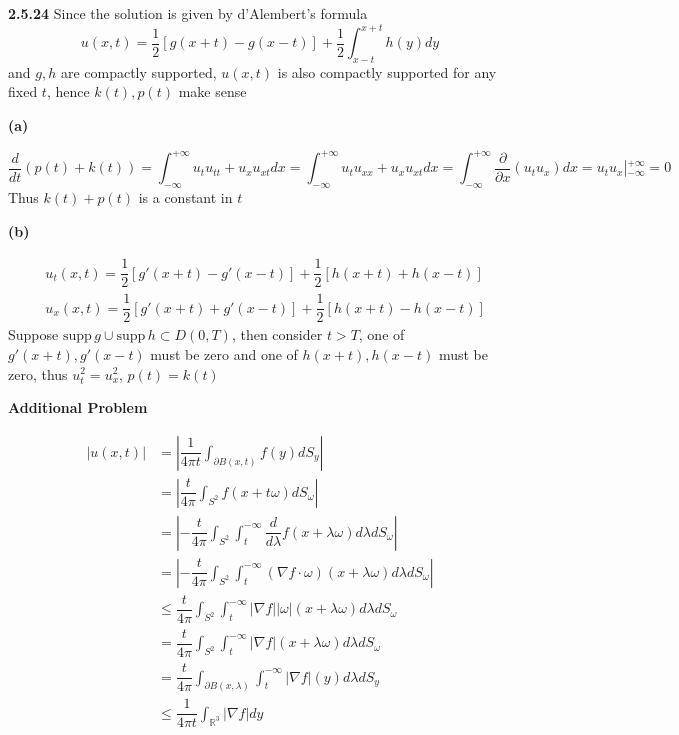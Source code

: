 \documentclass[../main.tex]{subfiles}
\begin{document}
\begin{customproblem}\textbf{2.5.24}
Since the solution is given by d'Alembert's formula
\[
u(x,t)=\dfrac{1}{2}[g(x+t)-g(x-t)]+\dfrac{1}{2}\int_{x-t}^{x+t}h(y)dy
\]
and $g,h$ are compactly supported, $u(x,t)$ is also compactly supported for any fixed $t$, hence $k(t),p(t)$ make sense \par
\textbf{(a)} \par
\[
\dfrac{d}{dt}(p(t)+k(t))=\int_{-\infty}^{+\infty}u_tu_{tt}+u_xu_{xt}dx=\int_{-\infty}^{+\infty}u_tu_{xx}+u_xu_{xt}dx
=\int_{-\infty}^{+\infty}\dfrac{\partial}{\partial x}\left(u_tu_x\right) dx=u_tu_x\left|_{-\infty}^{+\infty}\right.=0
\]
Thus $k(t)+p(t)$ is a constant in $t$ \par
\textbf{(b)} \par
\[
\begin{aligned}
&u_t(x,t)=\dfrac{1}{2}[g'(x+t)-g'(x-t)]+\dfrac{1}{2}[h(x+t)+h(x-t)] \\
&u_x(x,t)=\dfrac{1}{2}[g'(x+t)+g'(x-t)]+\dfrac{1}{2}[h(x+t)-h(x-t)]
\end{aligned}
\]
Suppose $\mathrm{supp}\,g\cup\mathrm{supp}\,h\subset D(0,T)$, then consider $t>T$, one of $g'(x+t),g'(x-t)$ must be zero and one of $h(x+t),h(x-t)$ must be zero, thus $u_t^2=u_x^2$, $p(t)=k(t)$ \par
\textbf{Additional Problem} \par
\[
\begin{aligned}
|u(x,t)|
&=\left|\dfrac{1}{4\pi t}\int_{\partial B(x,t)}f(y)dS_y\right| \\
&=\left|\dfrac{t}{4\pi}\int_{S^2}f(x+t\omega)dS_\omega\right| \\
&=\left|-\dfrac{t}{4\pi}\int_{S^2}\int_t^{-\infty}\dfrac{d}{d\lambda}f(x+\lambda\omega)d\lambda dS_\omega\right| \\
&=\left|-\dfrac{t}{4\pi}\int_{S^2}\int_t^{-\infty}(\nabla f\cdot\omega)(x+\lambda\omega)d\lambda dS_\omega\right| \\
&\leq\dfrac{t}{4\pi}\int_{S^2}\int_t^{-\infty}\left|\nabla f\right||\omega|(x+\lambda\omega)d\lambda dS_\omega \\
&=\dfrac{t}{4\pi}\int_{S^2}\int_t^{-\infty}\left|\nabla f\right|(x+\lambda\omega)d\lambda dS_\omega \\
&=\dfrac{t}{4\pi}\int_{\partial B(x,\lambda)}\int_t^{-\infty}\left|\nabla f\right|(y)d\lambda dS_y \\
&\leq\dfrac{1}{4\pi t}\int_{\mathbb{R}^3}\left|\nabla f\right|dy \\
\end{aligned}
\]
\end{customproblem}
\end{document}
